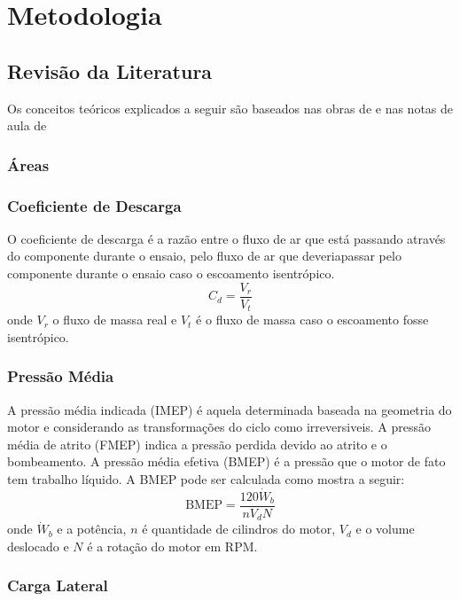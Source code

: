 \chapter{Metodologia}

\section{Revisão da Literatura}

Os conceitos teóricos explicados a seguir são baseados nas obras de \textcite{heywood2018internal, ferguson2015internal} e nas notas de aula de

\subsection{Áreas}

\subsection{Coeficiente de Descarga}

O coeficiente de descarga é a razão entre o fluxo de ar que está passando através do componente durante o ensaio, pelo fluxo de ar que deveriapassar pelo componente durante o ensaio caso o escoamento isentrópico.
%
\begin{equation}
    C_d = \frac{V_r}{V_t}
    \label{eq:coef_descarga}
\end{equation}
%
onde $V_r$ o fluxo de massa real e $V_t$ é o fluxo de massa caso o escoamento fosse isentrópico.

\subsection{Pressão Média}

A pressão média indicada (IMEP) é aquela determinada baseada na geometria do motor e considerando as transformações do ciclo como irreversiveis. 
A pressão média de atrito (FMEP) indica a pressão perdida devido ao atrito e o bombeamento.
A pressão média efetiva (BMEP) é a pressão que o motor de fato tem trabalho líquido.
A BMEP pode ser calculada como mostra a seguir:
%
\begin{equation}
    \text{BMEP} = \frac{120 \dot{W}_b}{n V_d N}
    \label{eq:bmep}
\end{equation}
%
onde $\dot{W}_b$ e a potência, $n$ é quantidade de cilindros do motor, $V_d$ e o volume deslocado e $N$ é a rotação do motor em RPM.

\subsection{Carga Lateral}


